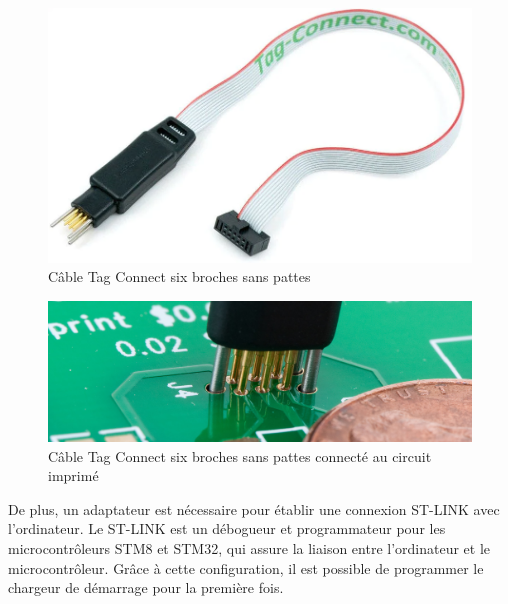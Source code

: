 \begin{figure}[H]
    \centering
    \includegraphics[scale=0.2]{./assets/figures/tag_connect.png}
    \caption{\cite{tag_connect} Câble Tag Connect six broches sans pattes}
\end{figure}

\begin{figure}[H]
    \centering
    \includegraphics[scale=0.2]{./assets/figures/tag_connect_pcb.jpg}
    \caption{\cite{tag_connect_pcb} Câble Tag Connect six broches sans pattes connecté au circuit imprimé}
\end{figure}

De plus, un adaptateur est nécessaire pour établir une connexion ST-LINK avec l'ordinateur.
Le ST-LINK est un débogueur et programmateur pour les microcontrôleurs STM8 et STM32, qui assure la liaison entre l'ordinateur et le microcontrôleur.
Grâce à cette configuration, il est possible de programmer le chargeur de démarrage pour la première fois.

